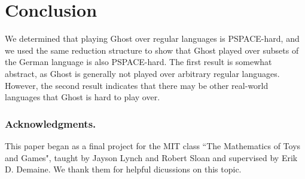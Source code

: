 \documentclass[runningheads,a4paper]{llncs}
\begin{document}
\section{Conclusion}
\label{Conclusion}

We determined that playing Ghost over regular languages is PSPACE-hard, and we used the same reduction structure to show that Ghost played over subsets of the German language is also PSPACE-hard. The first result is somewhat abstract, as Ghost is generally not played over arbitrary regular languages. However, the second result indicates that there may be other real-world languages that Ghost is hard to play over.

\subsubsection*{Acknowledgments.} This paper began as a final project for the MIT class ``The Mathematics of Toys and Games", taught by Jayson Lynch and Robert Sloan and supervised by Erik D. Demaine. We thank them for helpful dicussions on this topic.




%
%
%
%
%
%
%
%
\end{document}
